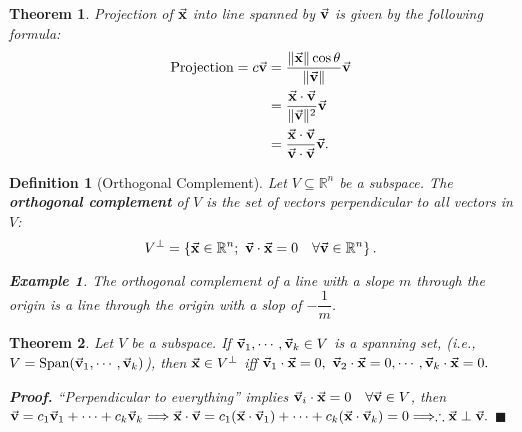 \documentclass[12pt, a4paper]{article}
\newtheorem{thm}{Theorem}[subsection]
\newtheorem{df}{Definition}[subsection]
\newtheorem{eg}{Example}[subsection]
\newenvironment*{prf}{\par\indent\textbf{\textit{Proof. }}}{\hfill $\blacksquare$\par}
\def\R{{\mathbb{R}}}
\def\Span{\mathrm{Span}}
\def\vecx{\va{x}}
\def\vecv{\va{v}}
\begin{document}
\begin{thm}
	Projection of $\vecx$ into line spanned by $\vecv$ is given by the following formula: 
	$$\begin{aligned}
		\text{Projection}=c\vecv&=\frac{\|\vecx\|\cos\theta}{\|\vecv\|}\vecv\\
		&=\frac{\vecx\cdot\vecv}{\|\vecv\|^2}\vecv\\
		&=\frac{\vecx\cdot\vecv}{\vecv\cdot\vecv}\vecv.
	\end{aligned}$$	
\end{thm}
\begin{df}[Orthogonal Complement]
	Let $V\subseteq\R^n$ be a subspace. The \textbf{orthogonal complement} of $V$ is the set of vectors perpendicular to all vectors in $V$: 
	\[V^\perp=\left\{\vecx\in\R^n;\ \vecv\cdot\vecx=0\quad\forall\vecv\in\R^n\right\}.\]	
	\begin{eg} The orthogonal complement of a line with a slope $m$ through the origin is a line through the origin with a slop of $-\dfrac{1}{m}$. \end{eg}
\end{df}
\begin{thm}
	Let $V$ be a subspace. If $\vecv_1,\cdots,\vecv_k\in V$ is a spanning set, (i.e., $V=\Span(\vecv_1,\cdots,\vecv_k)$), then $\vecx\in V^\perp$ \emph{iff} $\vecv_1\cdot\vecx=0,\ \vecv_2\cdot\vecx=0,\cdots,\vecv_k\cdot\vecx=0.$\\
	\begin{prf}
		``Perpendicular to everything'' implies $\vecv_i\cdot\vecx=0\quad\forall\vecv\in V$, then $\vecv=c_1\vecv_1+\cdots+c_k\vecv_k\Longrightarrow\vecx\cdot\vecv=c_1(\vecx\cdot\vecv_1)+\cdots+c_k(\vecx\cdot\vecv_k)=0\Longrightarrow\therefore\vecx\perp\vecv.$
	\end{prf}
\end{thm}
\end{document}
